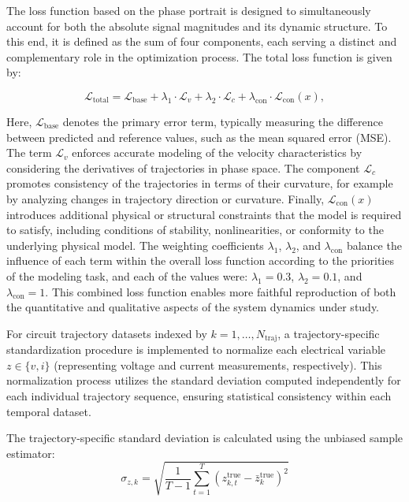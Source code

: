 \documentclass[11pt, oneside]{article}
\begin{document}
The loss function based on the phase portrait is designed to simultaneously account for both the absolute signal magnitudes and its dynamic structure. To this end, it is defined as the sum of four components, each serving a distinct and complementary role in the optimization process. The total loss function is given by:

\begin{equation}
    \mathcal{L}_{\mathrm{total}} = \mathcal{L}_{\mathrm{base}} + \lambda_1 \cdot \mathcal{L}_{v} + \lambda_2 \cdot \mathcal{L}_{c} + \lambda_{\mathrm{con}} \cdot \mathcal{L}_{\mathrm{con}}(x),
    \label{eq:loss_function}
\end{equation}

Here, $\mathcal{L}_{\mathrm{base}}$ denotes the primary error term, typically measuring the difference between predicted and reference values, such as the mean squared error (MSE). The term $\mathcal{L}_{v}$ enforces accurate modeling of the velocity characteristics by considering the derivatives of trajectories in phase space. The component $\mathcal{L}_{c}$ promotes consistency of the trajectories in terms of their curvature, for example by analyzing changes in trajectory direction or curvature. Finally, $\mathcal{L}_{\mathrm{con}}(x)$ introduces additional physical or structural constraints that the model is required to satisfy, including conditions of stability, nonlinearities, or conformity to the underlying physical model. The weighting coefficients $\lambda_1$, $\lambda_2$, and $\lambda_{\mathrm{con}}$ balance the influence of each term within the overall loss function according to the priorities of the modeling task, and each of the values were: $\lambda_1=0.3$, $\lambda_2=0.1$, and $\lambda_{\mathrm{con}}=1$. This combined loss function enables more faithful reproduction of both the quantitative and qualitative aspects of the system dynamics under study.


For circuit trajectory datasets indexed by $k = 1, \ldots, N_{\text{traj}}$, a trajectory-specific standardization procedure is implemented to normalize each electrical variable $z \in \{v, i\}$ (representing voltage and current measurements, respectively). This normalization process utilizes the standard deviation computed independently for each individual trajectory sequence, ensuring statistical consistency within each temporal dataset.

The trajectory-specific standard deviation is calculated using the unbiased sample estimator:
\begin{equation}
    \sigma_{z,k} = \sqrt{\frac{1}{T-1} \sum_{t=1}^{T} \left(z_{k,t}^{\mathrm{true}} - \bar{z}_k^{\mathrm{true}}\right)^2}
\end{equation}
\end{document}

